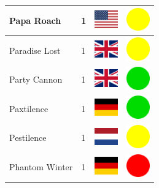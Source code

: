 \documentclass[12pt, a4paper, twoside]{report}
\begin{document}
\begin{center}
\begin{longtable}{|p{5cm}|p{2cm}|p{2cm}|p{2cm}|}
			Papa Roach & 1 & \includegraphics[width=1cm]{4x3/us} & \includegraphics[width=1cm]{likes/m} \\ \hline
			Paradise Lost & 1 & \includegraphics[width=1cm]{4x3/gb} & \includegraphics[width=1cm]{likes/m} \\ \hline
			Party Cannon & 1 & \includegraphics[width=1cm]{4x3/gb} & \includegraphics[width=1cm]{likes/y} \\ \hline
			Paxtilence & 1 & \includegraphics[width=1cm]{4x3/de} & \includegraphics[width=1cm]{likes/y} \\ \hline
			Pestilence & 1 & \includegraphics[width=1cm]{4x3/nl} & \includegraphics[width=1cm]{likes/m} \\ \hline
			Phantom Winter & 1 & \includegraphics[width=1cm]{4x3/de} & \includegraphics[width=1cm]{likes/n} \\ \hline

\end{longtable}
\end{center}
\end{document}
